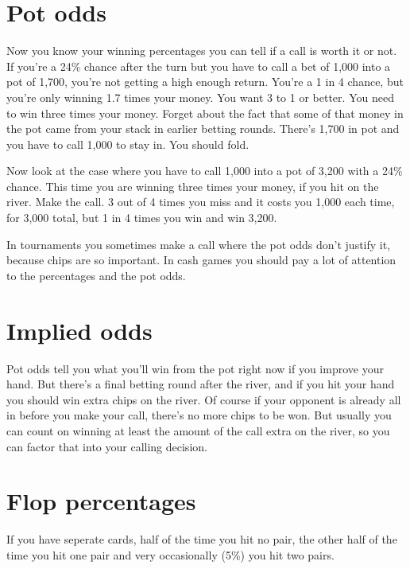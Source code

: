 \section{Pot odds}

Now you know your winning percentages you can tell if a call is worth
it or not. If you're a 24\% chance after the turn but you have to call
a bet of 1,000 into a pot of 1,700, you're not getting a high enough
return. You're a 1 in 4 chance, but you're only winning 1.7 times your
money. You want 3 to 1 or better. You need to win three times your
money. Forget about the fact that some of that money in the pot came
from your stack in earlier betting rounds. There's 1,700 in pot and
you have to call 1,000 to stay in. You should fold.


Now look at the case where you have to call 1,000
into a pot of 3,200 with a 24\% chance. This time you are winning
three times your money, if you hit on the river. Make the call. 3 out
of 4 times you miss and it costs you 1,000 each time, for 3,000 total,
but 1 in 4 times you win and win 3,200.


In tournaments you sometimes make a call where the pot odds don't
justify it, because chips are so important. In cash games you should
pay a lot of attention to the percentages and the pot odds.

\section{Implied odds}

Pot odds tell you what you'll win from the pot right now if you
improve your hand. But there's a final betting round after the river,
and if you hit your hand you should win extra chips on the river. Of
course if your opponent is already all in before you make your call,
there's no more chips to be won. But usually you can count on winning
at least the amount of the call extra on the river, so you can factor
that into your calling decision.

\section{Flop percentages}

If you have seperate cards, half of the time you hit no pair, the
other half of the time you hit one pair and very occasionally (5\%)
you hit two pairs.

